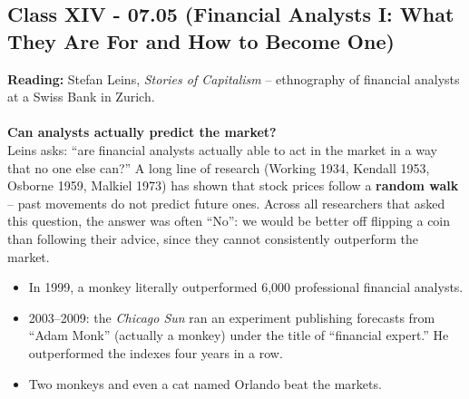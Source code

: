 \documentclass[a4paper,12pt]{article}
\begin{document}
\subsection*{Class XIV - 07.05 (Financial Analysts I: What They Are For and How to Become One)}
\noindent \textbf{Reading:} Stefan Leins, \emph{Stories of Capitalism} -- ethnography of financial analysts at a Swiss Bank in Zurich. \\
\\
\noindent \textbf{Can analysts actually predict the market?} \\
\noindent Leins asks: ``are financial analysts actually able to act in the market in a way that no one else can?'' A long line of research (Working 1934, Kendall 1953, Osborne 1959, Malkiel 1973) has shown that stock prices follow a \textbf{random walk} -- past movements do not predict future ones. Across all researchers that asked this question, the answer was often ``No'': we would be better off flipping a coin than following their advice, since they cannot consistently outperform the market.
\begin{itemize}
	\item In 1999, a monkey literally outperformed 6,000 professional financial analysts.
	\item 2003--2009: the \emph{Chicago Sun} ran an experiment publishing forecasts from ``Adam Monk'' (actually a monkey) under the title of ``financial expert.'' He outperformed the indexes four years in a row.
	\item Two monkeys and even a cat named Orlando beat the markets.
\end{itemize}
\end{document}
